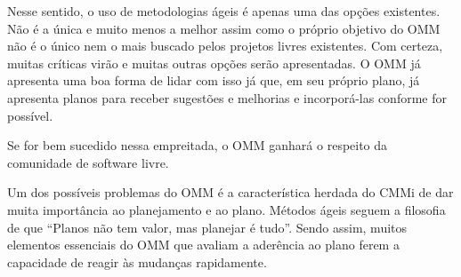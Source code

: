 Nesse sentido, o uso de metodologias ágeis é apenas uma das opções
existentes.  Não é a única e muito menos a melhor assim como o próprio
objetivo do OMM não é o único nem o mais buscado pelos projetos livres
existentes. Com certeza, muitas críticas virão e muitas outras opções
serão apresentadas. O OMM já apresenta uma boa forma de lidar com isso
já que, em seu próprio plano, já apresenta planos para receber
sugestões e melhorias e incorporá-las conforme for possível.

Se for bem sucedido nessa empreitada, o OMM ganhará o respeito da
comunidade de software livre.


Um dos possíveis problemas do OMM é a característica herdada do CMMi
de dar muita importância ao planejamento e ao plano. Métodos ágeis
seguem a filosofia de que ``Planos não tem valor, mas planejar é
tudo''. Sendo assim, muitos elementos essenciais do OMM que avaliam a
aderência ao plano ferem a capacidade de reagir às mudanças
rapidamente.

